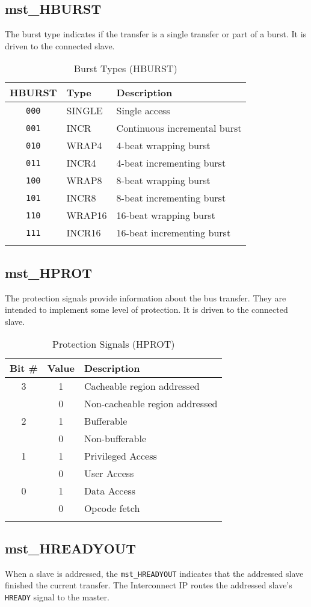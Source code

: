 \subsection{mst\_HBURST}\label{mst_hburst}

The burst type indicates if the transfer is a single transfer or part of
a burst. It is driven to the connected slave.

\begin{longtable}[]{@{}cll@{}}
\toprule
HBURST & Type & Description\tabularnewline
\midrule
\endhead
\texttt{000} & SINGLE & Single access\tabularnewline
\texttt{001} & INCR & Continuous incremental burst\tabularnewline
\texttt{010} & WRAP4 & 4-beat wrapping burst\tabularnewline
\texttt{011} & INCR4 & 4-beat incrementing burst\tabularnewline
\texttt{100} & WRAP8 & 8-beat wrapping burst\tabularnewline
\texttt{101} & INCR8 & 8-beat incrementing burst\tabularnewline
\texttt{110} & WRAP16 & 16-beat wrapping burst\tabularnewline
\texttt{111} & INCR16 & 16-beat incrementing burst\tabularnewline
\bottomrule
\caption{Burst Types (HBURST)}
\end{longtable}

\subsection{mst\_HPROT}\label{mst_hprot}

The protection signals provide information about the bus transfer. They
are intended to implement some level of protection. It is driven to the
connected slave.

\begin{longtable}[]{@{}ccl@{}}
\toprule
Bit \# & Value & Description\tabularnewline
\midrule
\endhead
3 & 1 & Cacheable region addressed\tabularnewline
& 0 & Non-cacheable region addressed\tabularnewline
2 & 1 & Bufferable\tabularnewline
& 0 & Non-bufferable\tabularnewline
1 & 1 & Privileged Access\tabularnewline
& 0 & User Access\tabularnewline
0 & 1 & Data Access\tabularnewline
& 0 & Opcode fetch\tabularnewline
\bottomrule
\caption{Protection Signals (HPROT)}
\end{longtable}

\subsection{mst\_HREADYOUT}\label{mst_hreadyout}

When a slave is addressed, the \texttt{mst\_HREADYOUT} indicates that the
addressed slave finished the current transfer. The Interconnect IP
routes the addressed slave's \texttt{HREADY} signal to the master.

